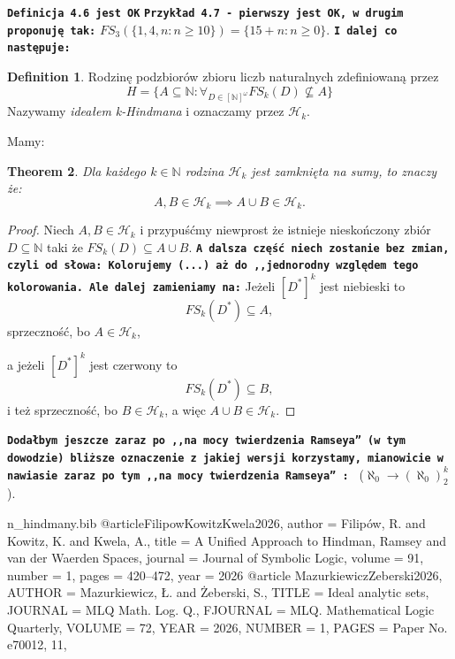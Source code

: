 \documentclass[12pt]{amsart}
\theoremstyle{plain}
\newtheorem{theorem}{Theorem}[section]
\theoremstyle{definition}
\newtheorem{definition}[theorem]{Definition}
\theoremstyle{remark}
\newcommand{\nnatural}{\mathbb{N}}
\newcommand{\idealHindmana}{\mathcal{H}}
\begin{document}
{\bf \tt Definicja 4.6 jest OK}
{\bf \tt Przykład 4.7 - pierwszy jest OK, w drugim 
  proponuję tak:}
  $FS_3(\lbrace 1,4, n \colon n \geq 10\rbrace) = \lbrace 15 + n \colon n \geq 0\rbrace$.
{\bf \tt I dalej co następuje:}
  \begin{definition}
  Rodzinę podzbiorów zbioru liczb naturalnych
  zdefiniowaną przez
  \[
    H = \lbrace A \subseteq \nnatural \colon \forall_{D \in
[\nnatural]^{\omega}}
      FS_k(D) \not\subseteq A \rbrace
    \]
    Nazywamy {\it ideałem k-Hindmana} i oznaczamy przez $\idealHindmana_k$.
  \end{definition}
  Mamy:
  \begin{theorem}
    Dla każdego $k \in \nnatural$ rodzina
    $\idealHindmana_k$ jest zamknięta na sumy, to znaczy że:
    \[A,B \in \idealHindmana_k \implies A \cup B \in \idealHindmana_k.\]
    
  \end{theorem}
  \begin{proof}
    Niech $A, B \in \idealHindmana_k$ i przypuśćmy niewprost że istnieje
    nieskończony zbiór $D \subseteq \nnatural$ taki że
    $FS_k(D) \subseteq A \cup B$.
    {\bf \tt A dalsza część niech zostanie bez zmian,
      czyli od słowa: Kolorujemy (...) aż do ,,jednorodny względem tego kolorowania. Ale dalej zamieniamy na:}
    Jeżeli $[D^*]^k$ jest niebieski to
    \[FS_k(D^*) \subseteq A,\]
    sprzeczność, bo $A \in \idealHindmana_k$,
    
    a jeżeli $[D^*]^k$ jest czerwony to
    \[FS_k(D^*) \subseteq B,\]
    i też sprzeczność, bo $B \in \idealHindmana_k$,
    a więc $A \cup B \in \idealHindmana_k$.
   \end{proof}
   {\bf \tt Dodałbym jeszcze zaraz po ,,na mocy twierdzenia Ramseya'' (w tym dowodzie)
     bliższe oznaczenie z jakiej wersji korzystamy, mianowicie w nawiasie zaraz po
     tym ,,na mocy twierdzenia Ramseya''  : } ($\aleph_0 \to (\aleph_0)^k_2$).

\begin{filecontents*}{n_hindmany.bib}
@article{FilipowKowitzKwela2026,
  author  = {Filip{\'o}w, R. and Kowitz, K. and Kwela, A.},
  title   = {A Unified Approach to Hindman, Ramsey and van der Waerden Spaces},
  journal = {Journal of Symbolic Logic},
  volume   = {91},
  number   = {1},
  pages    = {420--472},
  year     = {2026}
}
@article {MazurkiewiczZeberski2026,
    AUTHOR = {Mazurkiewicz, \L. and \.Zeberski, S.},
     TITLE = {Ideal analytic sets},
   JOURNAL = {MLQ Math. Log. Q.},
  FJOURNAL = {MLQ. Mathematical Logic Quarterly},
    VOLUME = {72},
      YEAR = {2026},
    NUMBER = {1},
     PAGES = {Paper No. e70012, 11},
}
\end{filecontents*}

\printbibliography
\end{document}
